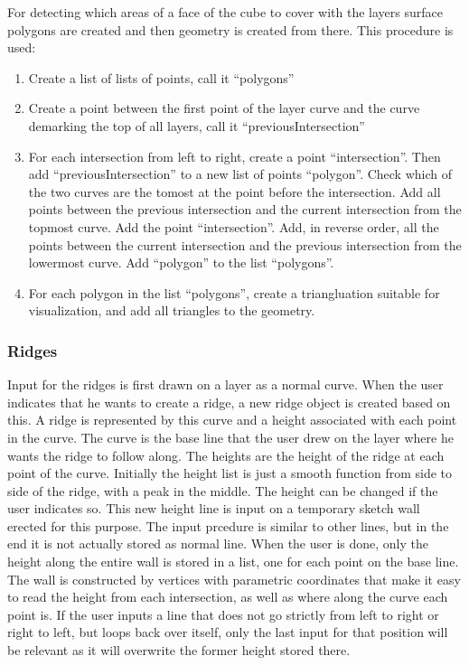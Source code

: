 \documentclass[a4paper,12pt]{article}
\begin{document}
For detecting which areas of a face of the cube to cover with the layers surface polygons are created and then geometry is created from there. This procedure is used:
\begin{enumerate}
 \item Create a list of lists of points, call it ``polygons''
 \item Create a point between the first point of the layer curve and the curve demarking the top of all layers, call it ``previousIntersection''
 \item For each intersection from left to right, create a point ``intersection''. Then add ``previousIntersection'' to a new list of points ``polygon''. Check which of the two curves are the tomost at the point before the intersection. Add all points between the previous intersection and the current intersection from the topmost curve. Add the point ``intersection''. Add, in reverse order, all the points between the current intersection and the previous intersection from the lowermost curve. Add ``polygon'' to the list ``polygons''.
 \item For each polygon in the list ``polygons'', create a triangluation suitable for visualization, and add all triangles to the geometry.
\end{enumerate}

\subsubsection{Ridges}
Input for the ridges is first drawn on a layer as a normal curve. When the user indicates that he wants to create a ridge, a new ridge object is created based on this. A ridge is represented by this curve and a height associated with each point in the curve. The curve is the base line that the user drew on the layer where he wants the ridge to follow along. The heights are the height of the ridge at each point of the curve. Initially the height list is just a smooth function from side to side of the ridge, with a peak in the middle. The height can be changed if the user indicates so. This new height line is input on a temporary sketch wall erected for this purpose. The input prcedure is similar to other lines, but in the end it is not actually stored as normal line. When the user is done, only the height along the entire wall is stored in a list, one for each point on the base line. The wall is constructed by vertices with parametric coordinates that make it easy to read the height from each intersection, as 
well as where along the curve each point is. If the user inputs a line that does not go strictly from left to right or right to left, but loops back over itself, only the last input for that position will be relevant as it will overwrite the former height stored there.
\end{document}
